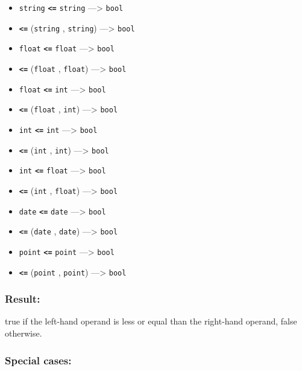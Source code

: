 \documentclass[]{book}
\providecommand{\tightlist}{%
  \setlength{\itemsep}{0pt}\setlength{\parskip}{0pt}}
\theoremstyle{definition}
\theoremstyle{definition}
\theoremstyle{definition}
\theoremstyle{remark}
\begin{document}
\begin{itemize}
\tightlist
\item
  \texttt{string} \textbf{\texttt{\textless{}=}} \texttt{string}
  ---\textgreater{} \texttt{bool}
\item
  \textbf{\texttt{\textless{}=}} (\texttt{string} , \texttt{string})
  ---\textgreater{} \texttt{bool}
\item
  \texttt{float} \textbf{\texttt{\textless{}=}} \texttt{float}
  ---\textgreater{} \texttt{bool}
\item
  \textbf{\texttt{\textless{}=}} (\texttt{float} , \texttt{float})
  ---\textgreater{} \texttt{bool}
\item
  \texttt{float} \textbf{\texttt{\textless{}=}} \texttt{int}
  ---\textgreater{} \texttt{bool}
\item
  \textbf{\texttt{\textless{}=}} (\texttt{float} , \texttt{int})
  ---\textgreater{} \texttt{bool}
\item
  \texttt{int} \textbf{\texttt{\textless{}=}} \texttt{int}
  ---\textgreater{} \texttt{bool}
\item
  \textbf{\texttt{\textless{}=}} (\texttt{int} , \texttt{int})
  ---\textgreater{} \texttt{bool}
\item
  \texttt{int} \textbf{\texttt{\textless{}=}} \texttt{float}
  ---\textgreater{} \texttt{bool}
\item
  \textbf{\texttt{\textless{}=}} (\texttt{int} , \texttt{float})
  ---\textgreater{} \texttt{bool}
\item
  \texttt{date} \textbf{\texttt{\textless{}=}} \texttt{date}
  ---\textgreater{} \texttt{bool}
\item
  \textbf{\texttt{\textless{}=}} (\texttt{date} , \texttt{date})
  ---\textgreater{} \texttt{bool}
\item
  \texttt{point} \textbf{\texttt{\textless{}=}} \texttt{point}
  ---\textgreater{} \texttt{bool}
\item
  \textbf{\texttt{\textless{}=}} (\texttt{point} , \texttt{point})
  ---\textgreater{} \texttt{bool}
\end{itemize}

\subsubsection{Result:}\label{result-11}

true if the left-hand operand is less or equal than the right-hand
operand, false otherwise.

\subsubsection{Special cases:}\label{special-cases-9}
\end{document}
